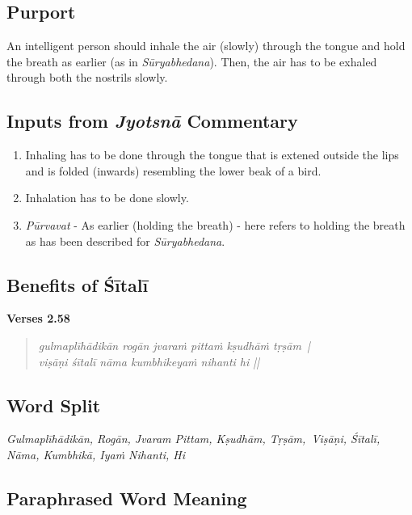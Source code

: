 \subsection*{Purport}


An intelligent person should inhale the air (slowly) through the tongue and hold the breath as earlier (as in \textit{Sūryabhedana}). Then, the air has to be exhaled through both the nostrils slowly.

\subsection*{Inputs from \textit{Jyotsnā} Commentary}
\vspace{-10pt}

\begin{enumerate}
\itemsep=0pt
\item Inhaling has to be done through the tongue that is extened outside the lips and is folded (inwards) resembling the lower beak of a bird.
\item Inhalation has to be done slowly.
\item \textit{Pūrvavat} - As earlier (holding the breath) - here refers to holding the breath as has been described for \textit{Sūryabhedana}. 
\end{enumerate}

\subsection*{Benefits of Śītalī}

\noindent \textbf{Verses 2.58}

\begin{verse}
\textit{gulmaplīhādikān rogān jvaraṁ pittaṁ kṣudhāṁ tṛṣām |\\
viṣāṇi śītalī nāma kumbhikeyaṁ nihanti hi ||}
\end{verse}

\subsection*{Word Split}


\textit{Gulmaplīhādikān, Rogān, Jvaram Pittam, Kṣudhām, Tṛṣām, Viṣāṇi, Śītalī, Nāma, Kumbhikā, Iyaṁ Nihanti, Hi}

\subsection*{Paraphrased Word Meaning}


